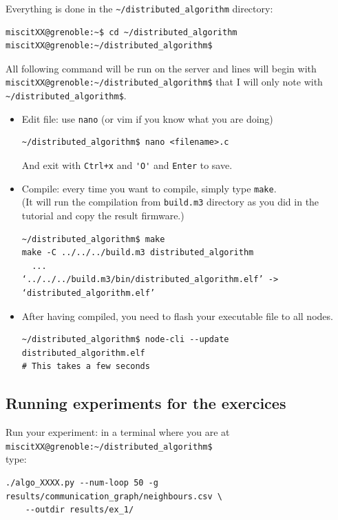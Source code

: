 \documentclass{article}
\begin{document}
Everything is done in the \verb=~/distributed_algorithm= directory:
\begin{verbatim}
miscitXX@grenoble:~$ cd ~/distributed_algorithm
miscitXX@grenoble:~/distributed_algorithm$
\end{verbatim}

All following command will be run on the server and lines will begin with\\
\verb=miscitXX@grenoble:~/distributed_algorithm$= that I will only note with
\verb=~/distributed_algorithm$=.


\begin{itemize}

\item Edit file: use \verb=nano= (or vim if you know what you are doing)
    \begin{verbatim}~/distributed_algorithm$ nano <filename>.c\end{verbatim}
    And exit with \verb=Ctrl+x= and \verb='O'= and \verb=Enter= to save.

\item Compile: every time you want to compile, simply type \verb=make=.\\
    (It will run the compilation from \verb=build.m3= directory as you did in the tutorial and copy the result firmware.)
    \begin{verbatim}~/distributed_algorithm$ make
make -C ../../../build.m3 distributed_algorithm
  ...
‘../../../build.m3/bin/distributed_algorithm.elf’ -> ‘distributed_algorithm.elf’
\end{verbatim}

\item After having compiled, you need to flash your executable file to all nodes.
    \begin{verbatim}~/distributed_algorithm$ node-cli --update distributed_algorithm.elf
# This takes a few seconds
\end{verbatim}

\end{itemize}


\subsection{Running experiments for the exercices}

Run your experiment: in a terminal where you are at \\
\verb=miscitXX@grenoble:~/distributed_algorithm$= \\
type:
\begin{verbatim}
./algo_XXXX.py --num-loop 50 -g results/communication_graph/neighbours.csv \
    --outdir results/ex_1/
\end{verbatim}
\end{document}
